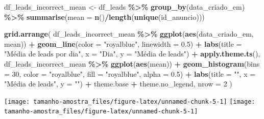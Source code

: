 \documentclass[
]{article}
\newenvironment{Shaded}{\begin{snugshade}}{\end{snugshade}}
\newcommand{\AttributeTok}[1]{\textcolor[rgb]{0.13,0.29,0.53}{#1}}
\newcommand{\DecValTok}[1]{\textcolor[rgb]{0.00,0.00,0.81}{#1}}
\newcommand{\FloatTok}[1]{\textcolor[rgb]{0.00,0.00,0.81}{#1}}
\newcommand{\FunctionTok}[1]{\textcolor[rgb]{0.13,0.29,0.53}{\textbf{#1}}}
\newcommand{\NormalTok}[1]{#1}
\newcommand{\OtherTok}[1]{\textcolor[rgb]{0.56,0.35,0.01}{#1}}
\newcommand{\SpecialCharTok}[1]{\textcolor[rgb]{0.81,0.36,0.00}{\textbf{#1}}}
\newcommand{\StringTok}[1]{\textcolor[rgb]{0.31,0.60,0.02}{#1}}
\begin{document}
\begin{Shaded}
\begin{Highlighting}[]
\NormalTok{df\_leads\_incorrect\_mean }\OtherTok{\textless{}{-}}\NormalTok{ df\_leads }\SpecialCharTok{\%\textgreater{}\%}
  \FunctionTok{group\_by}\NormalTok{(data\_criado\_em) }\SpecialCharTok{\%\textgreater{}\%}
  \FunctionTok{summarise}\NormalTok{(}\AttributeTok{mean =} \FunctionTok{n}\NormalTok{()}\SpecialCharTok{/}\FunctionTok{length}\NormalTok{(}\FunctionTok{unique}\NormalTok{(id\_anuncio)))}

\FunctionTok{grid.arrange}\NormalTok{(}
\NormalTok{  df\_leads\_incorrect\_mean }\SpecialCharTok{\%\textgreater{}\%}
    \FunctionTok{ggplot}\NormalTok{(}\FunctionTok{aes}\NormalTok{(data\_criado\_em, mean)) }\SpecialCharTok{+}
    \FunctionTok{geom\_line}\NormalTok{(}\AttributeTok{color =} \StringTok{"royalblue"}\NormalTok{, }\AttributeTok{linewidth =} \FloatTok{0.5}\NormalTok{) }\SpecialCharTok{+}
    \FunctionTok{labs}\NormalTok{(}\AttributeTok{title =} \StringTok{"Média de leads por dia"}\NormalTok{,}
         \AttributeTok{x =} \StringTok{"Dia"}\NormalTok{,}
         \AttributeTok{y =} \StringTok{"Média de leads"}\NormalTok{) }\SpecialCharTok{+}
    \FunctionTok{apply.theme.ts}\NormalTok{(),}
\NormalTok{  df\_leads\_incorrect\_mean }\SpecialCharTok{\%\textgreater{}\%}
    \FunctionTok{ggplot}\NormalTok{(}\FunctionTok{aes}\NormalTok{(mean)) }\SpecialCharTok{+}
    \FunctionTok{geom\_histogram}\NormalTok{(}\AttributeTok{bins =} \DecValTok{30}\NormalTok{, }\AttributeTok{color =} \StringTok{"royalblue"}\NormalTok{, }\AttributeTok{fill =} \StringTok{"royalblue"}\NormalTok{, }\AttributeTok{alpha =} \FloatTok{0.5}\NormalTok{) }\SpecialCharTok{+}
    \FunctionTok{labs}\NormalTok{(}\AttributeTok{title =} \StringTok{""}\NormalTok{,}
         \AttributeTok{x =} \StringTok{"Média de leads"}\NormalTok{,}
         \AttributeTok{y =} \StringTok{""}\NormalTok{) }\SpecialCharTok{+}
\NormalTok{    theme.base }\SpecialCharTok{+}\NormalTok{ theme.no\_legend,}
  \AttributeTok{nrow =} \DecValTok{2}
\NormalTok{)}
\end{Highlighting}
\end{Shaded}

\begin{center}  { \texttt{[image: tamanho-amostra\_files/figure-latex/unnamed-chunk-5-1]} } { \texttt{[image: tamanho-amostra\_files/figure-latex/unnamed-chunk-5-1]} }  \end{center}
\end{document}
